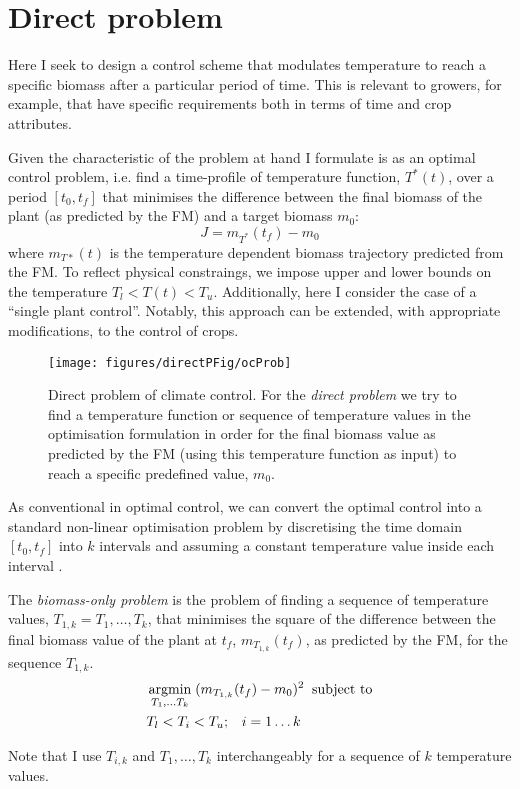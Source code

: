 \section{Direct problem}
Here I seek to design a control scheme that modulates temperature to reach a
specific biomass after a particular period of time. This is relevant to growers,
for example, that have specific requirements both in terms of time and crop
attributes.

Given the characteristic of the problem at hand I formulate is as an optimal
control problem, i.e. find a time-profile of temperature function, $T^*(t)$,
over a period $[t_0, t_f]$ that minimises the difference between the final
biomass of the plant (as predicted by the FM) and a target biomass $m_0$:
$$
J = m_{T^*}(t_f) - m_0
$$
where $m_{T*}(t)$ is the temperature dependent biomass trajectory predicted from
the FM. To reflect physical constraings, we impose upper and lower bounds on the
temperature $T_l < T(t) < T_u$. Additionally, here I consider the case of a
``single plant control''. Notably, this approach can be extended, with
appropriate modifications, to the control of crops.

\begin{figure}[tb]
\centering
\texttt{[image: figures/directPFig/ocProb]}
\caption{Direct problem of climate control. For the \emph{direct problem} we try
  to find a temperature function or sequence of temperature values in the
  optimisation formulation in order for the final biomass value as predicted by
  the FM (using this temperature function as input) to reach a specific
  predefined value, $m_0$.}
\label{fig:directP}
\end{figure}

As conventional in optimal control, we can convert the optimal control into a
standard non-linear optimisation problem by discretising the time domain
$[t_0, t_f]$ into $k$ intervals and assuming a constant temperature value inside
each interval \citep{kraft_converting_1985}.
\begin{definition}
The \emph{biomass-only problem} is the problem of finding a sequence of
temperature values, $T_{1, k}=T_1, \dots, T_k$, that minimises the square of the
difference between the final biomass value of the plant at $t_f$,
$m_{T_{1, k}}(t_f)$, as predicted by the FM, for the sequence $T_{1, k}$.
\begin{align*}
& \operatorname*{argmin}_{T_1, \dots T_k} \; (m_{T_{1, k}}(t_f) - m_0)^2 \; \; \text{subject to} \\
& T_l < T_{i} < T_u; \; \; \; i=1 \dots k
\end{align*}
\end{definition}
Note that I use $T_{i, k}$ and $T_1, \dots, T_k$ interchangeably for a sequence of
$k$ temperature values.

